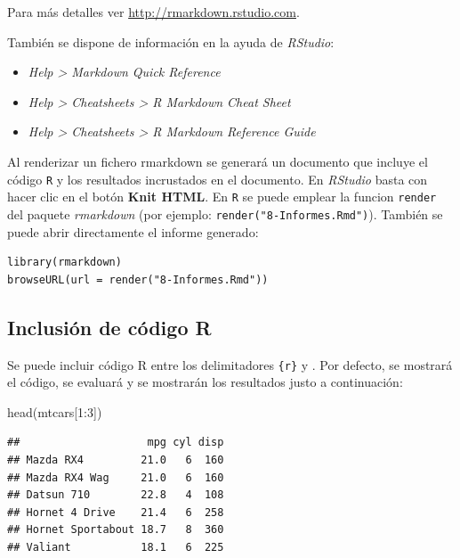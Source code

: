\documentclass[
]{book}
\newenvironment{Shaded}{\begin{snugshade}}{\end{snugshade}}
\newcommand{\DecValTok}[1]{\textcolor[rgb]{0.00,0.00,0.81}{#1}}
\newcommand{\FunctionTok}[1]{\textcolor[rgb]{0.00,0.00,0.00}{#1}}
\newcommand{\NormalTok}[1]{#1}
\newcommand{\SpecialCharTok}[1]{\textcolor[rgb]{0.00,0.00,0.00}{#1}}
\theoremstyle{break}
\theoremstyle{nonumberplain}
\begin{document}
Para más detalles ver \url{http://rmarkdown.rstudio.com}.

También se dispone de información en la ayuda de \emph{RStudio}:

\begin{itemize}
\item
  \emph{Help \textgreater{} Markdown Quick Reference}
\item
  \emph{Help \textgreater{} Cheatsheets \textgreater{} R Markdown Cheat Sheet}
\item
  \emph{Help \textgreater{} Cheatsheets \textgreater{} R Markdown Reference Guide}
\end{itemize}

Al renderizar un fichero rmarkdown se generará un documento que incluye el código \texttt{R}
y los resultados incrustados en el documento.
En \emph{RStudio} basta con hacer clic en el botón \textbf{Knit HTML}.
En \texttt{R} se puede emplear la funcion \texttt{render} del paquete \emph{rmarkdown}
(por ejemplo: \texttt{render("8-Informes.Rmd")}).
También se puede abrir directamente el informe generado:

\begin{verbatim}
library(rmarkdown)
browseURL(url = render("8-Informes.Rmd"))
\end{verbatim}

\hypertarget{inclusiuxf3n-de-cuxf3digo-r}{%
\subsection{Inclusión de código R}\label{inclusiuxf3n-de-cuxf3digo-r}}

Se puede incluir código R entre los delimitadores \texttt{\textasciigrave{}\textasciigrave{}\textasciigrave{}\{r\}} y \texttt{\textasciigrave{}\textasciigrave{}\textasciigrave{}}. Por defecto, se mostrará el código, se evaluará y se mostrarán los resultados justo a continuación:

\begin{Shaded}
\begin{Highlighting}[]
\FunctionTok{head}\NormalTok{(mtcars[}\DecValTok{1}\SpecialCharTok{:}\DecValTok{3}\NormalTok{])}
\end{Highlighting}
\end{Shaded}

\begin{verbatim}
##                    mpg cyl disp
## Mazda RX4         21.0   6  160
## Mazda RX4 Wag     21.0   6  160
## Datsun 710        22.8   4  108
## Hornet 4 Drive    21.4   6  258
## Hornet Sportabout 18.7   8  360
## Valiant           18.1   6  225
\end{verbatim}
\end{document}

